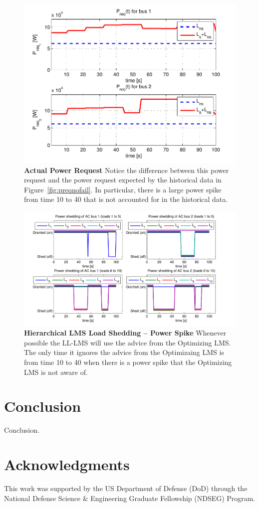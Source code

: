 \documentclass{acm_proc_article-sp}
\begin{document}
\begin{figure}[htb]
  \centering
  \includegraphics[width=0.9\columnwidth]{figures/preqpwrspike}
  \caption{\textbf{Actual Power Request} Notice the difference between this power
  request and the power request expected by the historical data in 
  Figure~\ref{fig:preqnofail}. In particular, there is a large power spike from time 10
  to 40 that is not accounted for in the historical data.}
  \label{fig:preqpwrspike}
\end{figure}
\begin{figure}[htb]
  \centering
  \includegraphics[width=0.9\columnwidth]{figures/lsolpwrspike}
  \caption{\textbf{Hierarchical LMS Load Shedding -- Power Spike} Whenever possible the LL-LMS will
  use the advice from the Optimizing LMS. The only time it ignores the advice from the Optimizaing LMS is
  from time 10 to 40 when there is a power spike that the Optimizing LMS is not aware of.}
  \label{fig:lsolpwrspike}
\end{figure}

\section{Conclusion}
Conclusion.

\section*{Acknowledgments}
This work was supported by the US Department of Defense (DoD) through the National Defense Science \& Engineering Graduate Fellowship (NDSEG) Program.


 
\end{document}
